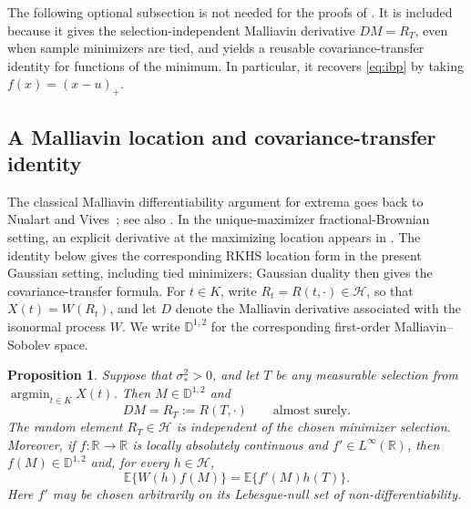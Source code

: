 \documentclass[11pt]{amsart}
\newtheorem{proposition}[proposition]{Proposition}
\theoremstyle{definition}
\theoremstyle{remark}
\DeclareMathOperator*{\argmin}{argmin}
\newcommand{\Ee}{\mathbb E}
\newcommand{\cH}{\mathcal H}
\begin{document}
The following optional subsection is not needed for the proofs of
.  It is included because it gives the
selection-independent Malliavin derivative $DM=R_T$, even when sample
minimizers are tied, and yields a reusable covariance-transfer identity
for functions of the minimum.  In particular, it recovers \eqref{eq:ibp}
by taking $f(x)=(x-u)_+$.

\subsection{A Malliavin location and covariance-transfer identity}

The classical Malliavin differentiability argument for extrema goes back
to Nualart and Vives~\cite[Theorems~1--2]{NualartVives1988}; see also
\cite[Propositions~2.1.10--2.1.11]{Nualart2006}.  In the unique-maximizer
fractional-Brownian setting, an explicit derivative at the maximizing
location appears in \cite[Lemma~3]{LanjriZadiNualart2003}.  The identity
below gives the corresponding RKHS location form in the present Gaussian
setting, including tied minimizers; Gaussian duality then gives the
covariance-transfer formula.  For $t\in K$, write
$R_t=R(t,\cdot)\in\cH$, so that $X(t)=W(R_t)$, and let $D$ denote the
Malliavin derivative associated with the isonormal process $W$.  We write
$\mathbb D^{1,2}$ for the corresponding first-order Malliavin--Sobolev
space.

\begin{proposition} 
\label{prop:malliavin-location}
Suppose that $\sigma_*^2>0$, and let $T$ be any measurable selection from
$\argmin_{t\in K}X(t)$.  Then $M\in\mathbb D^{1,2}$ and
\begin{equation}
 DM=R_T:=R(T,\cdot)\qquad\text{almost surely}.
 \label{eq:derivative-minimum}
\end{equation}
The random element $R_T\in\cH$ is independent of the chosen minimizer
selection.  Moreover, if $f:\mathbb R\to\mathbb R$ is locally absolutely
continuous and $f'\in L^\infty(\mathbb R)$, then
$f(M)\in\mathbb D^{1,2}$ and, for every $h\in\cH$,
\begin{equation}
 \Ee\bigl\{W(h)f(M)\bigr\}
 =\Ee\bigl\{f'(M)h(T)\bigr\}.
 \label{eq:malliavin-location}
\end{equation}
Here $f'$ may be chosen arbitrarily on its Lebesgue-null set of
non-differentiability.
\end{proposition}
\end{document}
